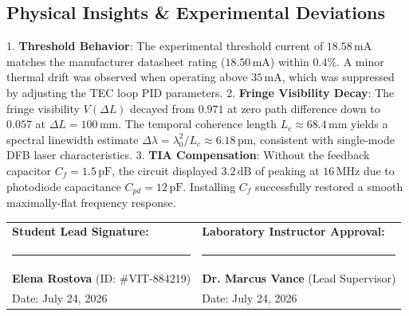 \documentclass[11pt,a4paper,parskip=half,headsepline=0.6pt,footsepline=0.4pt]{scrartcl}
\begin{document}
\subsection{Physical Insights \& Experimental Deviations}
1. \textbf{Threshold Behavior}: The experimental threshold current of $18.58\,\text{mA}$ matches the manufacturer datasheet rating ($18.50\,\text{mA}$) within $0.4\%$. A minor thermal drift was observed when operating above $35\,\text{mA}$, which was suppressed by adjusting the TEC loop PID parameters.
2. \textbf{Fringe Visibility Decay}: The fringe visibility $V(\Delta L)$ decayed from $0.971$ at zero path difference down to $0.057$ at $\Delta L = 100\,\text{mm}$. The temporal coherence length $L_c \approx 68.4\,\text{mm}$ yields a spectral linewidth estimate $\Delta \lambda = \lambda_0^2 / L_c \approx 6.18\,\text{pm}$, consistent with single-mode DFB laser characteristics.
3. \textbf{TIA Compensation}: Without the feedback capacitor $C_f = 1.5\,\text{pF}$, the circuit displayed $3.2\,\text{dB}$ of peaking at $16\,\text{MHz}$ due to photodiode capacitance $C_{pd} = 12\,\text{pF}$. Installing $C_f$ successfully restored a smooth maximally-flat frequency response.

\vspace{4pt}

\begin{tcolorbox}[labbox, colback=white, colframe=navyprimary, title={\small \faSignature\ Formal Laboratory Verification \& Approval Register}]
  \vspace{2pt}
  \begin{tabularx}{\linewidth}{X X}
    \textbf{Student Lead Signature:} & \textbf{Laboratory Instructor Approval:} \\[18pt]
    \rule{0.85\linewidth}{0.6pt} & \rule{0.85\linewidth}{0.6pt} \\
    \textbf{Elena Rostova} (ID: \#VIT-884219) & \textbf{Dr. Marcus Vance} (Lead Supervisor) \\
    Date: July 24, 2026 & Date: July 24, 2026
  \end{tabularx}
  \vspace{2pt}
\end{tcolorbox}
\end{document}
